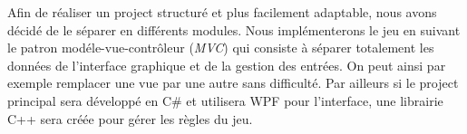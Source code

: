 Afin de réaliser un project structuré et plus facilement adaptable, nous avons décidé de le séparer en différents modules. Nous implémenterons le jeu en suivant le patron modéle-vue-contrôleur (\emph{MVC}) qui consiste à séparer totalement les données de l'interface graphique et de la gestion des entrées. On peut ainsi par exemple remplacer une vue par une autre sans difficulté. Par ailleurs si le project principal sera développé en C\# et utilisera WPF pour l'interface, une librairie C++ sera créée pour gérer les règles du jeu.